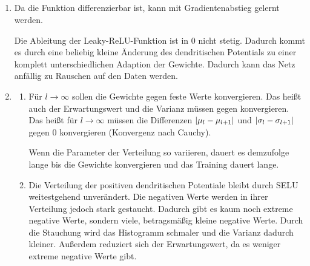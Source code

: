 \documentclass[DIN, pagenumber=false, fontsize=11pt, parskip=half]{scrartcl}
\DeclarePairedDelimiter\abs{\lvert}{\rvert}%
\begin{document}
    \subsection{}
    \begin{enumerate}[label=\alph*)]
        \item Da die Funktion differenzierbar ist, kann mit Gradientenabstieg gelernt werden.

            Die Ableitung der Leaky-ReLU-Funktion ist in $0$ nicht stetig. Dadurch kommt es durch eine beliebig kleine Änderung des dendritischen Potentials zu
            einer komplett unterschiedlichen Adaption der Gewichte. Dadurch kann das Netz anfällig zu Rauschen auf den Daten werden.
        \item 
            \begin{enumerate}[label=\roman*.]
                \item Für $l \to \infty$ sollen die Gewichte gegen feste Werte konvergieren. Das heißt auch der Erwartungswert und die Varianz müssen gegen konvergieren. Das heißt für $l \to \infty$ müssen die Differenzen $\abs{\mu_l - \mu_{l+1}}$ und $\abs{\sigma_l - \sigma_{l+1}}$ gegen $0$ konvergieren (Konvergenz nach Cauchy).

                    Wenn die Parameter der Verteilung so variieren, dauert es demzufolge lange bis die Gewichte konvergieren und das Training dauert lange.
                \item Die Verteilung der positiven dendritischen Potentiale bleibt durch SELU weitestgehend unverändert. Die negativen Werte werden in ihrer Verteilung jedoch stark gestaucht. Dadurch gibt es kaum noch extreme negative Werte, sondern viele, betragsmäßig kleine negative Werte.
                    Durch die Stauchung wird das Histogramm schmaler und die Varianz dadurch kleiner. Außerdem reduziert sich der Erwartungswert, da es weniger extreme negative Werte gibt.
            \end{enumerate}
    \end{enumerate}
\end{document}
